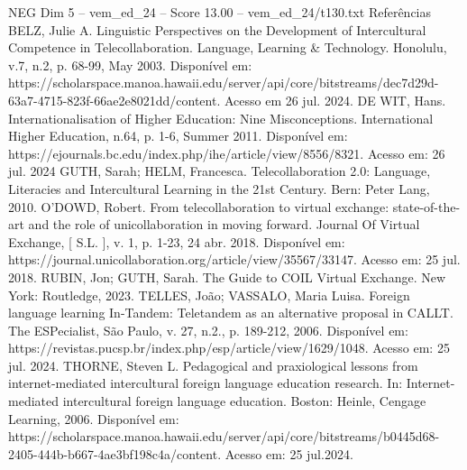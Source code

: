 \begin{textsample}{NEG Dim 5 – vem\_ed\_24 – Score 13.00 – vem\_ed\_24/t130.txt}
Referências BELZ, Julie A.
Linguistic Perspectives on the Development of Intercultural Competence in Telecollaboration.
Language, Learning \& Technology.
Honolulu, v.7, n.2, p. 68-99, May 2003.
Disponível em: https://scholarspace.manoa.hawaii.edu/server/api/core/bitstreams/dec7d29d-63a7-4715-823f-66ae2e8021dd/content.
Acesso em 26 jul. 2024.
DE WIT, Hans.
Internationalisation of Higher Education: Nine Misconceptions.
International Higher Education, n.64, p. 1-6, Summer 2011.
Disponível em: https://ejournals.bc.edu/index.php/ihe/article/view/8556/8321.
Acesso em: 26 jul. 2024 GUTH, Sarah; HELM, Francesca.
Telecollaboration 2.0: Language, Literacies and Intercultural Learning in the 21st Century.
Bern: Peter Lang, 2010.
O'DOWD, Robert.
From telecollaboration to virtual exchange: state-of-the-art and the role of unicollaboration in moving forward.
Journal Of Virtual Exchange, [ S.L. ], v. 1, p. 1-23, 24 abr. 2018.
Disponível em: https://journal.unicollaboration.org/article/view/35567/33147.
Acesso em: 25 jul. 2018.
RUBIN, Jon; GUTH, Sarah.
The Guide to COIL Virtual Exchange.
New York: Routledge, 2023.
TELLES, João; VASSALO, Maria Luisa.
Foreign language learning In-Tandem: Teletandem as an alternative proposal in CALLT.
The ESPecialist, São Paulo, v. 27, n.2., p. 189-212, 2006.
Disponível em: https://revistas.pucsp.br/index.php/esp/article/view/1629/1048.
Acesso em: 25 jul. 2024.
THORNE, Steven L.
Pedagogical and praxiological lessons from internet-mediated intercultural foreign language education research.
In: Internet-mediated intercultural foreign language education.
Boston: Heinle, Cengage Learning, 2006.
Disponível em: https://scholarspace.manoa.hawaii.edu/server/api/core/bitstreams/b0445d68-2405-444b-b667-4ae3bf198c4a/content.
Acesso em: 25 jul.2024.

\end{textsample}
